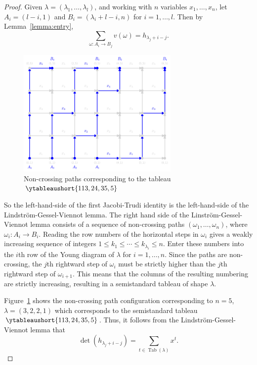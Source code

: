 \documentclass[11pt]{amsart}
\theoremstyle{definition}
\theoremstyle{example}
\DeclareMathOperator{\tab}{Tab}
\begin{document}
\begin{proof}
  Given $\lambda=(\lambda_1,\dotsc,\lambda_l)$, and working with $n$ variables $x_1,\dotsc,x_n$, let $A_i = (l-i, 1)$ and $B_i=(\lambda_i+l-i, n)$ for $i=1,\dotsc, l$.
  Then  by Lemma~\ref{lemma:entry},
  \begin{displaymath}
    \sum_{\omega:A_i\to B_j} v(\omega) = h_{\lambda_j+i-j}.
  \end{displaymath}
  \begin{figure}
    \centering
    \includegraphics[width=0.7\textwidth]{jth.png}
    \caption{Non-crossing paths corresponding to the tableau \small{$\ytableaushort{113,24,35,5}$}}
    \label{fig:jacobi-trudi}
  \end{figure}
  So the left-hand-side of the first Jacobi-Trudi identity is the left-hand-side of the Lindstr\"om-Gessel-Viennot lemma.
  The right hand side of the Linstr\"om-Gessel-Viennot lemma consists of a sequence of non-crossing paths $(\omega_1,\dotsc,\omega_n)$, where $\omega_i:A_i\to B_i$.
  Reading the row numbers of the horizontal steps in $\omega_i$ gives a weakly increasing sequence of integers $1\leq k_1 \leq \dotsb \leq k_{\lambda_i}\leq n$.
  Enter these numbers into the $i$th row of the Young diagram of $\lambda$ for $i=1,\dotsc,n$.
  Since the paths are non-crossing, the $j$th rightward step of $\omega_i$ must be strictly higher than the $j$th rightward step of $\omega_{i+1}$.
  This means that the columns of the resulting numbering are strictly increasing, resulting in a semistandard tableau of shape $\lambda$.

  Figure~\ref{fig:jacobi-trudi} shows the non-crossing path configuration corresponding to $n=5$, $\lambda=(3,2,2,1)$ which corresponds to the semistandard tableau \small{$\ytableaushort{113,24,35,5}$}.
  Thus, it follows from the Lindstr\"om-Gessel-Viennot lemma that
  \begin{displaymath}
    \det(h_{\lambda_j+i-j}) = \sum_{t\in \tab(\lambda)} x^t.
  \end{displaymath}


\end{proof}
\end{document}

